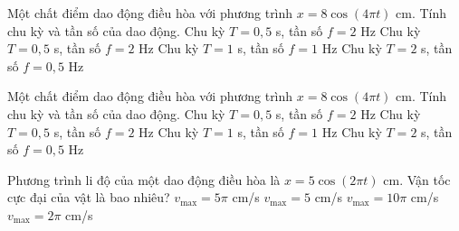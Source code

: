 \begin{ex}
Một chất điểm dao động điều hòa với phương trình $x=8\cos\left(4\pi t\right)$ cm. Tính chu kỳ và tần số của dao động.
\choice
{Chu kỳ $T=0{,}5$ s, tần số $f=2$ Hz}
{\True Chu kỳ $T=0{,}5$ s, tần số $f=2$ Hz}
{Chu kỳ $T=1$ s, tần số $f=1$ Hz}
{Chu kỳ $T=2$ s, tần số $f=0{,}5$ Hz}
\end{ex}

\begin{ex}
Một chất điểm dao động điều hòa với phương trình $x=8\cos\left(4\pi t\right)$ cm. Tính chu kỳ và tần số của dao động.
\choice
{Chu kỳ $T=0{,}5$ s, tần số $f=2$ Hz}
{\True Chu kỳ $T=0{,}5$ s, tần số $f=2$ Hz}
{Chu kỳ $T=1$ s, tần số $f=1$ Hz}
{Chu kỳ $T=2$ s, tần số $f=0{,}5$ Hz}
\end{ex}

\begin{ex}
Phương trình li độ của một dao động điều hòa là $x = 5\cos(2\pi t)$ cm. Vận tốc cực đại của vật là bao nhiêu?
\choice
{$v_{\max} = 5\pi$ cm/s}
{$v_{\max} = 5$ cm/s}
{\True $v_{\max} = 10\pi$ cm/s}
{$v_{\max} = 2\pi$ cm/s}
\end{ex}

